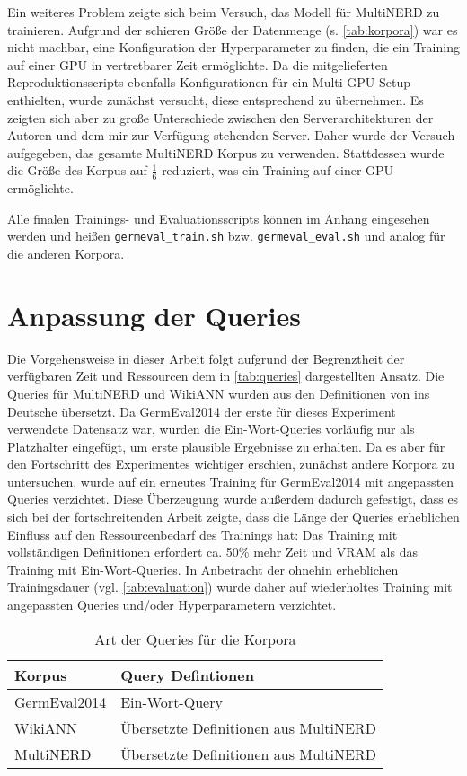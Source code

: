 Ein weiteres Problem zeigte sich beim Versuch, das Modell für MultiNERD zu trainieren. Aufgrund der schieren Größe der Datenmenge (s. \autoref{tab:korpora}) war es nicht machbar, eine Konfiguration der Hyperparameter zu finden, die ein Training auf einer GPU in vertretbarer Zeit ermöglichte. Da die mitgelieferten Reproduktionsscripts ebenfalls Konfigurationen für ein Multi-GPU Setup enthielten, wurde zunächst versucht, diese entsprechend zu übernehmen. Es zeigten sich aber zu große Unterschiede zwischen den Serverarchitekturen der Autoren und dem mir zur Verfügung stehenden Server. Daher wurde der Versuch aufgegeben, das gesamte MultiNERD Korpus zu verwenden. Stattdessen wurde die Größe des Korpus auf \(\frac{1}{6}\) reduziert, was ein Training auf einer GPU ermöglichte.

Alle finalen Trainings- und Evaluationsscripts können im Anhang eingesehen werden und heißen \verb|germeval_train.sh| bzw. \verb|germeval_eval.sh| und analog für die anderen Korpora.


\section{Anpassung der Queries}
\label{ch:Training:sec:Anpassung_Queries}


Die Vorgehensweise in dieser Arbeit folgt aufgrund der Begrenztheit der verfügbaren Zeit und Ressourcen dem in \autoref{tab:queries} dargestellten Ansatz. Die Queries für MultiNERD und WikiANN wurden aus den Definitionen von \cite[4]{multinerd} ins Deutsche übersetzt. Da GermEval2014 der erste für dieses Experiment verwendete Datensatz war, wurden die Ein-Wort-Queries vorläufig nur als Platzhalter eingefügt, um erste plausible Ergebnisse zu erhalten. Da es aber für den Fortschritt des Experimentes wichtiger erschien, zunächst andere Korpora zu untersuchen, wurde auf ein erneutes Training für GermEval2014 mit angepassten Queries verzichtet. Diese Überzeugung wurde außerdem dadurch gefestigt, dass es sich bei der fortschreitenden Arbeit zeigte, dass die Länge der Queries erheblichen Einfluss auf den Ressourcenbedarf des Trainings hat: Das Training mit vollständigen Definitionen erfordert ca. 50\% mehr Zeit und VRAM als das Training mit Ein-Wort-Queries. In Anbetracht der ohnehin erheblichen Trainingsdauer (vgl. \autoref{tab:evaluation}) wurde daher auf wiederholtes Training mit angepassten Queries und/oder Hyperparametern verzichtet.

\begin{table}[!htbp]
	\centering
	\caption{Art der Queries für die Korpora}
	\label{tab:queries}
	\begin{tabular}{@{}ll@{}}
	\toprule
		\textbf{Korpus} & \textbf{Query Defintionen} \\ \midrule
		GermEval2014    & Ein-Wort-Query             \\
		WikiANN         & Übersetzte Definitionen aus MultiNERD \\
		MultiNERD       & Übersetzte Definitionen aus MultiNERD \\ \bottomrule
	\end{tabular}
\end{table}


